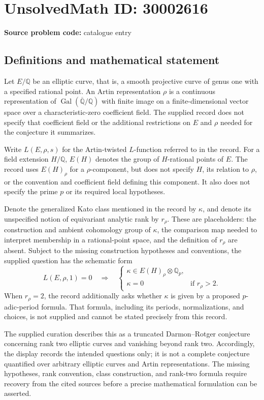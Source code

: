 \documentclass[11pt]{article}
\newcommand{\Q}{\mathbb{Q}}
\begin{document}
\section*{UnsolvedMath ID: 30002616}
\textbf{Source problem code:} catalogue entry
\subsection{Definitions and mathematical statement}
Let $E/\Q$ be an elliptic curve, that is, a smooth projective curve of genus one with a specified rational point. An Artin representation $\rho$ is a continuous representation of $\operatorname{Gal}(\overline{\Q}/\Q)$ with finite image on a finite-dimensional vector space over a characteristic-zero coefficient field. The supplied record does not specify that coefficient field or the additional restrictions on $E$ and $\rho$ needed for the conjecture it summarizes.

Write $L(E,\rho,s)$ for the Artin-twisted $L$-function referred to in the record. For a field extension $H/\Q$, $E(H)$ denotes the group of $H$-rational points of $E$. The record uses $E(H)_\rho$ for a $\rho$-component, but does not specify $H$, its relation to $\rho$, or the convention and coefficient field defining this component. It also does not specify the prime $p$ or its required local hypotheses.

Denote the generalized Kato class mentioned in the record by $\kappa$, and denote its unspecified notion of equivariant analytic rank by $r_\rho$. These are placeholders: the construction and ambient cohomology group of $\kappa$, the comparison map needed to interpret membership in a rational-point space, and the definition of $r_\rho$ are absent. Subject to the missing construction hypotheses and conventions, the supplied question has the schematic form
\[
L(E,\rho,1)=0
\quad\Longrightarrow\quad
\begin{cases}
\kappa\in E(H)_\rho\otimes\Q_p,\\
\kappa=0 & \text{if }r_\rho>2.
\end{cases}
\]
When $r_\rho=2$, the record additionally asks whether $\kappa$ is given by a proposed $p$-adic-period formula. That formula, including its periods, normalizations, and choices, is not supplied and cannot be stated precisely from this record.

The supplied curation describes this as a truncated Darmon--Rotger conjecture concerning rank two elliptic curves and vanishing beyond rank two. Accordingly, the display records the intended questions only; it is not a complete conjecture quantified over arbitrary elliptic curves and Artin representations. The missing hypotheses, rank convention, class construction, and rank-two formula require recovery from the cited sources before a precise mathematical formulation can be asserted.
\end{document}
